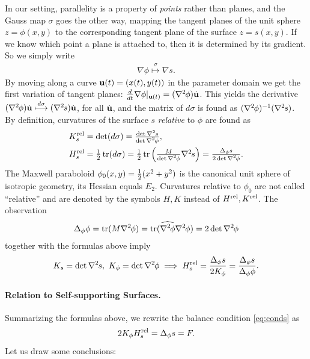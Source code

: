 \documentclass[review]{acmsiggraph}
\def\wh{\widehat}
\def\tr{\mathop{{\rm tr}}\nolimits}
\def\rel{{\mathord{{\rm rel}}}}
\def\ess{s}
\def\Hess#1{{\def\testess{#1}\nabla^2\ifx\testess\ess\!s\else #1\fi}}
\def\Hess#1{\text{$\nabla^2\hskip-.2ex #1$}}
\begin{document}
In our setting, parallelity is a property of {\em points} rather than 
planes, and the Gauss map $\sigma$ goes the other way, mapping the tangent 
planes of the unit sphere $z=\phi(x,y)$ to the corresponding tangent plane 
of the surface $z=s(x,y)$. If we know which point a plane is attached to, 
then it is determined by its gradient. So we simply write
	\begin{align*}
	\nabla \phi\overset\sigma\longmapsto\nabla s.
	\end{align*}
 By moving along a curve ${\mathbf u}(t)=(x(t),y(t))$ in the parameter domain we
get the first variation of tangent planes:
	$
	{d\over dt}\nabla \phi|_{\uw(t)} =
	(\Hess\phi)\dot\uw
	$.
 This yields the derivative
	$	
	(\Hess\phi)\dot\uw \overset{d\sigma}\longmapsto
	(\Hess s)\dot\uw $,
 for all $\dot{{\mathbf u}}$, and the matrix of $d\sigma$ is found as 
$(\Hess\phi)^{-1}(\Hess s)$.  By definition, curvatures of the surface $s$ 
{\em relative} to $\phi$ are found as
	\begin{align*}
		K_s^\rel
	& = \textstyle
		\det(d\sigma) =
		{\det\Hess s \over \det\Hess\phi} ,
	\\
		H_s^\rel
	&= \textstyle
		{1\over 2}\tr(d\sigma)
		= {1\over 2}\tr \left({M\over\det\Hess\phi} \Hess s\right)
		=  {\Delta_\phi s \over 2\det\Hess\phi}.
	\end{align*}
 The Maxwell paraboloid $\phi_0(x,y)={1\over 2}(x^2+y^2)$ is the canonical 
unit sphere of isotropic geometry, its Hessian equals $E_2$. Curvatures 
relative to $\phi_0$ are not called ``relative'' and are denoted by the 
symbols $H,K$ instead of $H^\rel,K^\rel$. The observation
	\begin{align*}
	\Delta_\phi \phi
	= \tr(M \Hess \phi)
	= \tr(\wh{\Hess\phi}\Hess\phi)
	= 2\det\Hess\phi
	\end{align*}
 together with the formulas above imply
	\begin{align*}
		K_s  = \det \Hess s, 
	\
		K_\phi = \det \Hess \phi
	\implies
		H_s^\rel =  {\Delta_\phi s \over 2 K_\phi}
			= {\Delta_\phi s\over \Delta_\phi \phi}.
	\end{align*}

\paragraph{Relation to Self-supporting Surfaces.}

Summarizing the formulas above, 
we rewrite the balance condition \eqref{eq:conds} as
	\begin{equation}
	2 K_\phi H_s^\rel  = \Delta_\phi s = F.
	\label{equigeo}
	\end{equation}
 Let us draw some conclusions:
\end{document}
